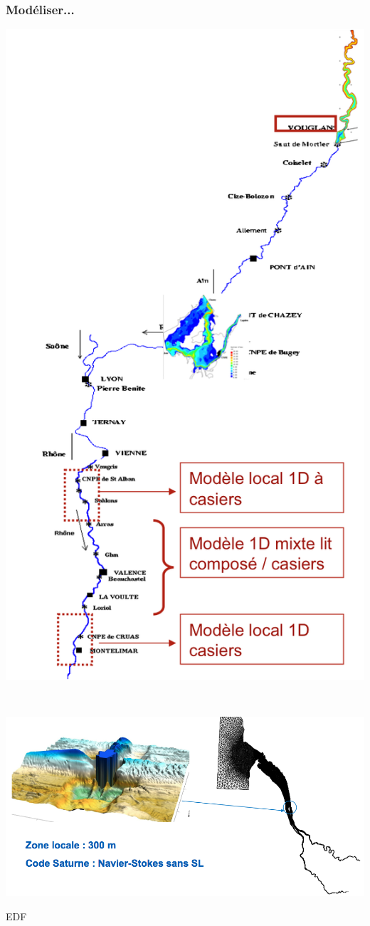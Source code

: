 \documentclass[slideopt,A4]{beamer}
\begin{document}
%
\begin{frame}
\frametitle{Modéliser...}
%
%
\begin{minipage}{35mm}
\includegraphics[width=0.99\linewidth]{edf.png}
\end{minipage}$\;$
\begin{minipage}{70mm}
\includegraphics[width=0.99\linewidth]{edf2.png}\\[10mm]
\centerline{\alert{EDF}}
\end{minipage}
%
\end{frame}
%
\end{document}
